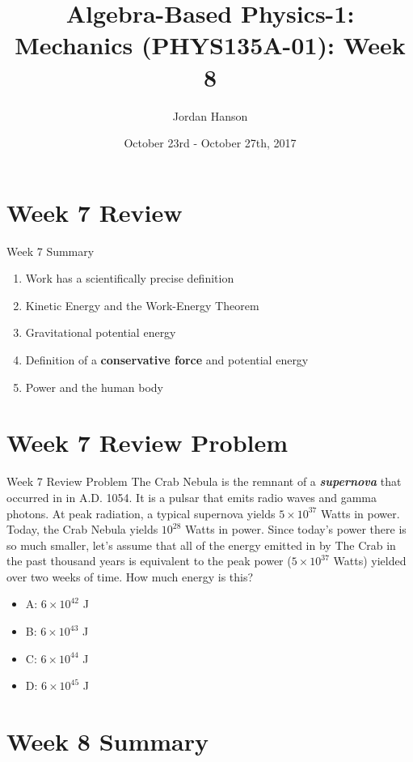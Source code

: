\documentclass{beamer}
\title{Algebra-Based Physics-1: Mechanics (PHYS135A-01): Week 8}
\date{October 23rd - October 27th, 2017}
\author{Jordan Hanson}
\institute{Whittier College Department of Physics and Astronomy}
\begin{document}
\maketitle

\section{Week 7 Review}

\begin{frame}{Week 7 Summary}
\begin{enumerate}
\item \alert{Work} has a scientifically precise definition
\item Kinetic Energy and the \alert{Work-Energy Theorem}
\item Gravitational potential energy
\item Definition of a \textbf{conservative force} and potential energy
\item Power and the human body
\end{enumerate}
\end{frame}

\section{Week 7 Review Problem}

\begin{frame}{Week 7 Review Problem}
\small
The Crab Nebula is the remnant of a \textit{\textbf{supernova}} that occurred in in A.D. 1054.  It is a pulsar that emits radio waves and gamma photons.  At peak radiation, a typical supernova yields $5\times 10^{37}$ Watts in power.  Today, the Crab Nebula yields $10^{28}$ Watts in power.  Since today's power there is so much smaller, let's assume that all of the energy emitted in by The Crab in the past thousand years is equivalent to the peak power ($5\times 10^{37}$ Watts) yielded over two weeks of time.  How much energy is this?
\begin{itemize}
\item A: $6\times 10^{42}$ J
\item B: $6\times 10^{43}$ J
\item C: $6\times 10^{44}$ J
\item D: $6\times 10^{45}$ J
\end{itemize}
\end{frame}

\section{Week 8 Summary}
\end{document}
